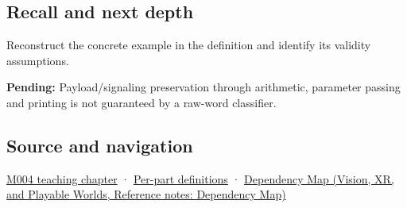 \subsection{Recall and next depth}\label{appendix-d6607cc4c235-recall-and-next-depth}

\hypertarget{appendix-d6607cc4c235-recall-and-next-depth}{}

Reconstruct the concrete example in the definition and identify its validity assumptions.

\textbf{Pending:} Payload/signaling preservation through arithmetic, parameter passing and printing is not guaranteed by a raw-word classifier.

\subsection{Source and navigation}\label{appendix-d6607cc4c235-source-and-navigation}

\hypertarget{appendix-d6607cc4c235-source-and-navigation}{}

\hyperref[01-foundations-i-ch001-a-stretching-ruler-for-real-valued-quantities]{M004 teaching chapter} · \hyperref[appendix-fd090d982a15-m004---parts-61-76]{Per-part definitions} · \href{../07-Vision-XR-and-Playable-Worlds/main.pdf\#nameddest=appendix-4ad47bdd269a}{Dependency Map (Vision, XR, and Playable Worlds, Reference notes: Dependency Map)}
